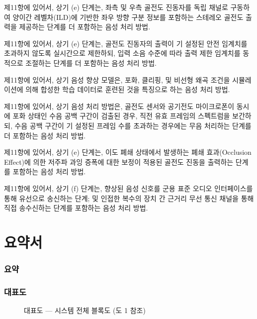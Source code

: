 \documentclass{article}
\begin{document}
\begin{enumerate}[label=\textbf{[\arabic*]}]
    \item 제11항에 있어서,
    상기 (e) 단계는, 좌측 및 우측 골전도 진동자를 독립 채널로 구동하여 양이간 레벨차(ILD)에 기반한 좌우 방향 구분 정보를 포함하는 스테레오 골전도 출력을 제공하는 단계를 더 포함하는 음성 처리 방법.

    \item 제11항에 있어서,
    상기 (e) 단계는, 골전도 진동자의 출력이 기 설정된 안전 임계치를 초과하지 않도록 실시간으로 제한하되, 입력 소음 수준에 따라 출력 제한 임계치를 동적으로 조절하는 단계를 더 포함하는 음성 처리 방법.

    \item 제11항에 있어서,
    상기 음성 향상 모델은, 포화, 클리핑, 및 비선형 왜곡 조건을 시뮬레이션에 의해 합성한 학습 데이터로 훈련된 것을 특징으로 하는 음성 처리 방법.

    \item 제11항에 있어서,
    상기 음성 처리 방법은, 골전도 센서와 공기전도 마이크로폰이 동시에 포화 상태인 수음 공백 구간이 검출된 경우, 직전 유효 프레임의 스펙트럼을 보간하되, 수음 공백 구간이 기 설정된 프레임 수를 초과하는 경우에는 무음 처리하는 단계를 더 포함하는 음성 처리 방법.

    \item 제11항에 있어서,
    상기 (e) 단계는, 이도 폐쇄 상태에서 발생하는 폐쇄 효과(Occlusion Effect)에 의한 저주파 과잉 증폭에 대한 보정이 적용된 골전도 진동을 출력하는 단계를 포함하는 음성 처리 방법.

    \item 제11항에 있어서,
    상기 (f) 단계는, 향상된 음성 신호를 군용 표준 오디오 인터페이스를 통해 유선으로 송신하는 단계; 및 인접한 복수의 장치 간 근거리 무선 통신 채널을 통해 직접 송수신하는 단계를 포함하는 음성 처리 방법.

\end{enumerate}


\part{요약서}

\section{요약}

\section{대표도}

\begin{figure}[H]
    \centering
    \resizebox{\textwidth}{!}{%
    }
    \caption*{대표도 — 시스템 전체 블록도 (도 1 참조)}
    \label{fig:representative}
\end{figure}

\printbibliography
\end{document}
